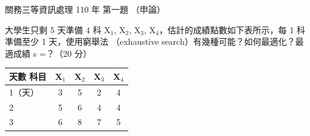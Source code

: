\begin{pastexam}[label={px:gw3-110-ds-01}]{關務三等資訊處理 110 年 第一題}
（申論）

大學生只剩 5 天準備 4 科 X$_1$, X$_2$, X$_3$, X$_4$，估計的成績點數如下表所示，每 1 科準備至少 1 天，使用窮舉法
（exhaustive search）有幾種可能？如何最適化？最適成績 s =？（20 分）
\begin{center}
\begin{tabular}{|l|c|c|c|c|}
\hline
天數 \hfill 科目 & X$_1$ & X$_2$ & X$_3$ & X$_4$ \\
\hline
1（天） & 3 & 5 & 2 & 4 \\
\hline
2 & 5 & 6 & 4 & 4 \\
\hline
3 & 6 & 8 & 7 & 5 \\
\hline
\end{tabular}
\end{center}
\end{pastexam}

